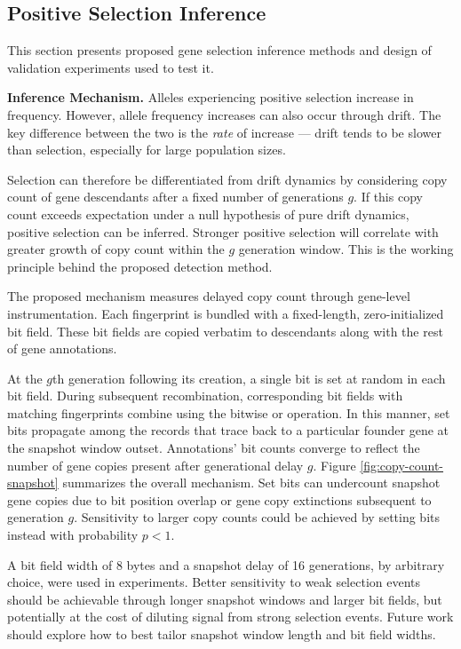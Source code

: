 \subsection{Positive Selection Inference}
\label{sec:selection-inference}

This section presents proposed gene selection inference methods and design of validation experiments used to test it.


\textbf{Inference Mechanism.}
Alleles experiencing positive selection increase in frequency.
However, allele frequency increases can also occur through drift.
The key difference between the two is the \textit{rate} of increase --- drift tends to be slower than selection, especially for large population sizes.

Selection can therefore be differentiated from drift dynamics by considering copy count of gene descendants after a fixed number of generations $g$.
If this copy count exceeds expectation under a null hypothesis of pure drift dynamics, positive selection can be inferred.
Stronger positive selection will correlate with greater growth of copy count within the $g$ generation window.
This is the working principle behind the proposed detection method.

The proposed mechanism measures delayed copy count through gene-level instrumentation.
Each fingerprint is bundled with a fixed-length, zero-initialized bit field.
These bit fields are copied verbatim to descendants along with the rest of gene annotations.

At the $g$th generation following its creation, a single bit is set at random in each bit field.
During subsequent recombination, corresponding bit fields with matching fingerprints combine using the bitwise or operation.
In this manner, set bits propagate among the records that trace back to a particular founder gene at the snapshot window outset.
Annotations' bit counts converge to reflect the number of gene copies present after generational delay $g$.
Figure \ref{fig:copy-count-snapshot} summarizes the overall mechanism.
Set bits can undercount snapshot gene copies due to bit position overlap or gene copy extinctions subsequent to generation $g$.
Sensitivity to larger copy counts could be achieved by setting bits instead with probability $p < 1$.

A bit field width of 8 bytes and a snapshot delay of 16 generations, by arbitrary choice, were used in experiments.
Better sensitivity to weak selection events should be achievable through longer snapshot windows and larger bit fields, but potentially at the cost of diluting signal from strong selection events.
Future work should explore how to best tailor snapshot window length and bit field widths.


